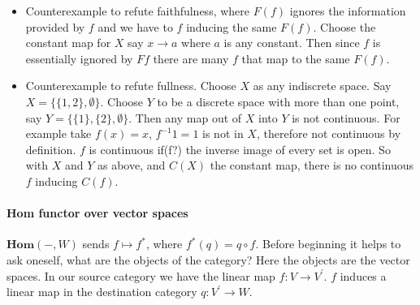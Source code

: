 \documentclass{article}
\begin{document}
\begin{itemize}

\item Counterexample to refute faithfulness, where $F(f)$ ignores the information provided by $f$ and we have to $f$ inducing the same $F(f)$. Choose the constant map for $X$ say $x \rightarrow a$ where $a$ is any constant. Then since $f$ is essentially ignored by $Ff$ there are many $f$ that map to the same $F(f)$.

\item Counterexample to refute fullness. Choose $X$ as any indiscrete space. Say $X = \{ \{1,2\}, \emptyset \}$. Choose $Y$ to be a discrete space with more than one point, say $Y = \{ \{1\}, \{2\}, \emptyset \}$. Then any map out of $X$ into $Y$ is not continuous. For example take $f(x) = x$, $f^{-1}{1} = {1}$ is not in $X$, therefore not continuous by definition. $f$ is continuous if(f?)  the inverse image of every set is open. So with $X$ and $Y$ as above, and $C(X)$ the constant map, there is no continuous $f$ inducing $C(f)$.

\end{itemize}

\paragraph{Hom functor over vector spaces}

$\mathbf{Hom}(-,W)$ sends $f \mapsto f^*$, where $ f^*(q) = q \circ f$. Before beginning it helps to ask oneself, what are the objects of the category? Here the objects are the vector spaces. In our source category we have the linear map $f\colon V \rightarrow V^\prime$. $f$ induces a linear map in the destination category $q\colon V^\prime \rightarrow W$.
\end{document}
